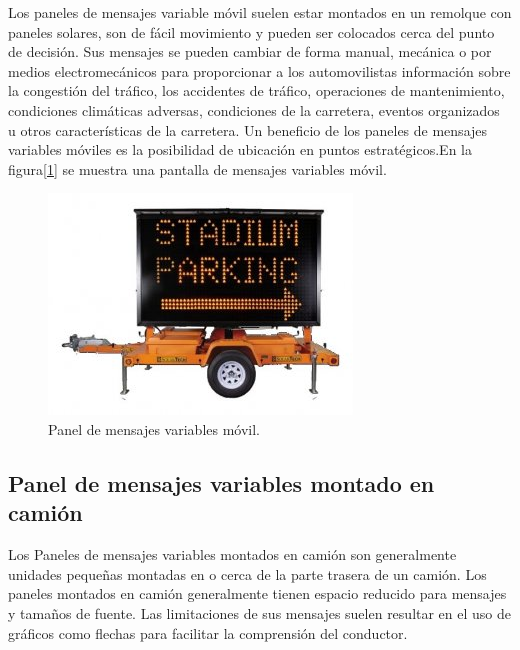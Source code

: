 Los paneles de mensajes variable móvil suelen estar montados en un remolque con paneles solares, son de fácil movimiento y pueden ser colocados cerca del punto de decisión. Sus mensajes se pueden cambiar de forma manual, mecánica o por medios electromecánicos para proporcionar a los automovilistas información sobre la congestión del tráfico, los accidentes de tráfico, operaciones de mantenimiento, condiciones climáticas adversas, condiciones de la carretera, eventos organizados u otros características de la carretera. Un beneficio de los paneles de mensajes variables móviles es la posibilidad de ubicación en puntos estratégicos.En la figura[\ref{fig:vmsm}] se muestra una pantalla de mensajes variables móvil\citep{VMSTYPES}.

\begin{figure}[htpb]
	\centering
	\includegraphics[width=.7\textwidth]{../Figures/vmsmovil.jpg} 
	\caption{Panel de mensajes variables móvil\protect\footnotemark.}
	\label{fig:vmsm}
\end{figure}



\subsection{Panel de mensajes variables montado en camión}

Los Paneles de mensajes variables montados en camión son generalmente unidades pequeñas montadas en o cerca de la parte trasera de un camión. Los paneles montados en camión generalmente tienen espacio reducido para mensajes y tamaños de fuente. Las limitaciones de sus mensajes suelen resultar en el uso de gráficos como flechas para facilitar la comprensión del conductor\citep{VMSTYPES}.

